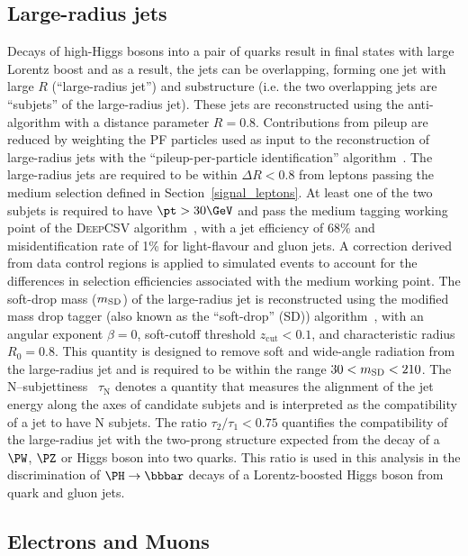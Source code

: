 \subsection{Large-radius jets}
\label{sec:ak8jets}

Decays of high-\pt Higgs bosons into a pair of \Pbottom quarks result in final states with large Lorentz boost and as a result, the \Pbottom jets can be overlapping, forming one jet with large $R$ (``large-radius jet'') and substructure (i.e. the two overlapping jets are ``subjets'' of the large-radius jet). These jets are reconstructed using the anti-\kt algorithm with a distance parameter $R = 0.8$. Contributions from pileup are reduced by weighting the PF particles used as input to the reconstruction of large-radius jets with the ``pileup-per-particle identification'' algorithm~\cite{Bertolini:2014bba}.
The large-radius jets are required to be within $\Delta R < 0.8$ from leptons passing the medium selection defined in Section~\ref{signal_leptons}.
At least one of the two subjets is required to have $\pt> 30\GeV$ and pass the medium \Pbottom tagging working point of the \textsc{DeepCSV} algorithm~\cite{CMS-BTV-16-002}, with a \Pbottom jet efficiency of 68\% and misidentification rate of 1\% for light-flavour and gluon jets. A correction derived from data control regions is applied to simulated events to account for the differences in selection efficiencies associated with the medium working point. The soft-drop mass ($m_{\mathrm{SD}}$) of the large-radius jet is reconstructed using the modified mass drop tagger (also known as the ``soft-drop'' (SD)) algorithm~\cite{Dasgupta:2013ihk,Butterworth:2008iy}, with an angular exponent $\beta = 0$, soft-cutoff threshold $z_{\text{cut}} < 0.1$, and characteristic radius $R_0 = 0.8$. This quantity is designed to remove soft and wide-angle radiation from the large-radius jet and is required to be within the range $30 < m_{\mathrm{SD}} < 210$\GeV.
The N--subjettiness~\cite{Thaler:2010tr} $\tau_{\mathrm{N}}$ denotes a quantity that measures the alignment of the jet energy along the axes of candidate subjets and is interpreted as the compatibility of a jet to have N subjets. The ratio $\tau_{2}/\tau_{1}< 0.75$ quantifies the compatibility of the large-radius jet with the two-prong structure expected from the decay of a $\PW$, $\PZ$ or Higgs boson into two quarks. This ratio is used in this analysis in the discrimination of $\Hbb$ decays of a Lorentz-boosted Higgs boson from quark and gluon jets.


\subsection{Electrons and Muons}
\label{sec:electron_and_muonId}

